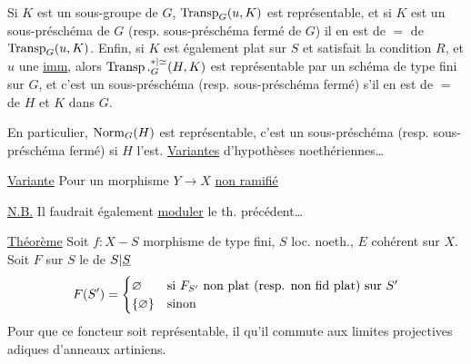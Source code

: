 Si $K$ est un sous-groupe de $G$,    $\operatorname{Transp}_G(u,K)$ est représentable, et si $K$ est un sous-préschéma de $G$ (resp. sous-préschéma fermé de $G$) il en est de $=$ de $\operatorname{Transp}_G(u,K)$. Enfin, si  $K$ est également plat  sur $S$ et satisfait la condition $R$,  et $u$ une \uline{imm}, alors  $\operatorname{Transp}.^{*|\simeq}_G(H,K)$ est représentable par un  schéma de type fini sur $G$, et c'est un sous-préschéma (resp. sous-préschéma fermé) s'il en est de $=$ de $H$ et $K$ dans $G$.

En particulier, $\operatorname{Norm}_G(H)$ est représentable, c'est un sous-préschéma (resp. sous-préschéma fermé)  si $H$ l'est.
\uline{Variantes}  d'hypothèses noethériennes\ldots

\uline{Variante} Pour un morphisme $Y\longrightarrow X$ \uline{non ramifié}

\uline{N.B.} Il faudrait également \uline{moduler} le th. précédent\ldots
{}

\uline{Théorème} Soit $f:X-S$ morphisme de type fini, $S$ loc. noeth., $E$ cohérent sur $X$. Soit $F$ sur $S$ le  de $S|\underline{S}$
\[
F(S')=\begin{cases}\varnothing&\text{si }F_{S'}\text{ non plat (resp. non fid plat) sur }S'\\\{\varnothing\}&\text{sinon}\end{cases}
\]
Pour que ce foncteur soit représentable, il  qu'il commute aux limites projectives adiques d'anneaux artiniens.

